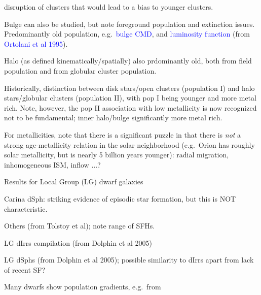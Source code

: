 \documentclass[12pt]{article}
\begin{document}
\begin{itemize*}
\begin{itemize*}
                      disruption of clusters that would lead to a bias to
                      younger clusters.
                  \item Bulge can also be studied, but note foreground population
                      and extinction issues. Predominantly old population,
                      e.g.\ \textcolor{blue}{bulge CMD}, and \textcolor{blue}
                      {luminosity function} (from \textcolor{blue}{Ortolani
                      et al 1995}).
                  \item Halo (as defined kinematically/spatially) also
                      prdominantly old, both from field population and from
                      globular cluster population.
                  \item Historically, distinction between disk stars/open
                      clusters (population I) and halo stars/globular clusters
                      (population II), with pop I being younger and more metal
                      rich. Note, however, the pop II association with low
                      metallicity is now recognized not to be fundamental;
                      inner halo/bulge significantly more metal rich.
                  \item For metallicities, note that there is a significant
                      puzzle in that there is \emph{not} a strong age-metallicity
                      relation in the solar neighborhood (e.g.\ Orion has
                      roughly solar metallicity, but is nearly 5 billion years
                      younger): radial migration, inhomogeneous ISM, inflow
                      $\ldots$?
              \end{itemize*}
          \item Results for Local Group (LG) dwarf galaxies
              \begin{itemize*}
                  \item Carina dSph: striking evidence of episodic star
                      formation, but this is NOT characteristic.
                  \item Others (from Tolstoy et al); note range of SFHs.
                  \item LG dIrrs compilation (from Dolphin et al 2005)
                  \item LG dSphs (from Dolphin et al 2005); possible similarity
                      to dIrrs apart from lack of recent SF?
                  \item Many dwarfs show population gradients, e.g.\ from

\end{itemize*}
\end{itemize*}
\end{document}
